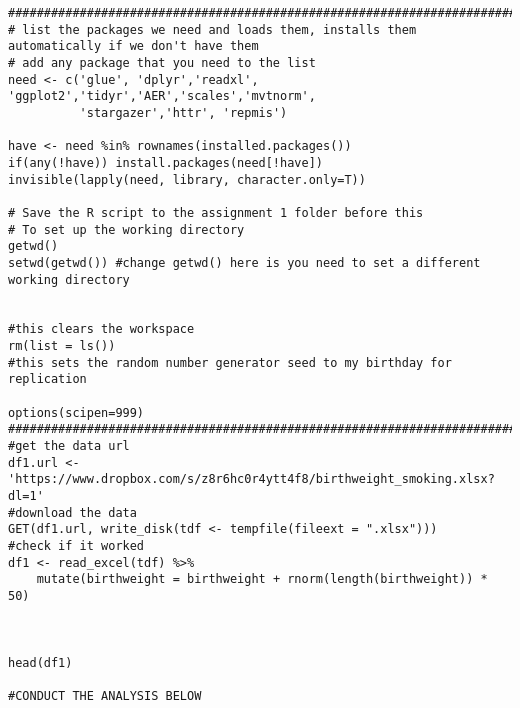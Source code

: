 \documentclass[
]{article}
\begin{document}
\begin{verbatim}
###############################################################################
# list the packages we need and loads them, installs them automatically if we don't have them
# add any package that you need to the list  
need <- c('glue', 'dplyr','readxl', 'ggplot2','tidyr','AER','scales','mvtnorm', 
          'stargazer','httr', 'repmis')

have <- need %in% rownames(installed.packages()) 
if(any(!have)) install.packages(need[!have]) 
invisible(lapply(need, library, character.only=T)) 

# Save the R script to the assignment 1 folder before this
# To set up the working directory
getwd()
setwd(getwd()) #change getwd() here is you need to set a different working directory


#this clears the workspace
rm(list = ls()) 
#this sets the random number generator seed to my birthday for replication

options(scipen=999)
###############################################################################
#get the data url 
df1.url <- 'https://www.dropbox.com/s/z8r6hc0r4ytt4f8/birthweight_smoking.xlsx?dl=1'
#download the data 
GET(df1.url, write_disk(tdf <- tempfile(fileext = ".xlsx")))
#check if it worked
df1 <- read_excel(tdf) %>%
    mutate(birthweight = birthweight + rnorm(length(birthweight)) * 50)



head(df1)

#CONDUCT THE ANALYSIS BELOW
\end{verbatim}
\end{document}
